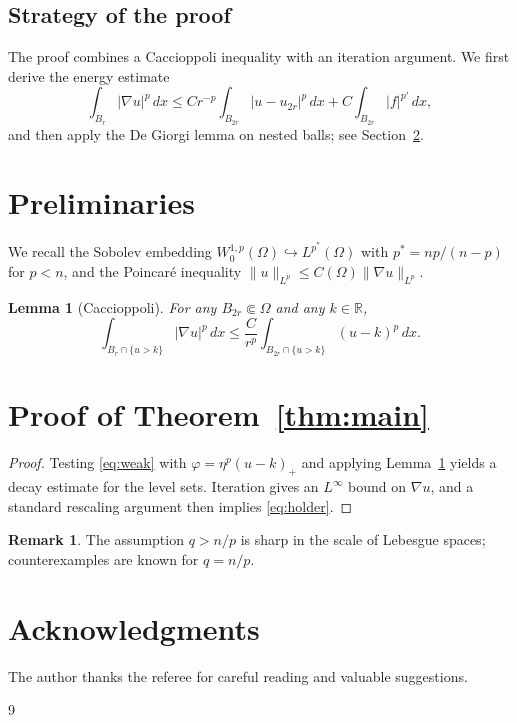 \documentclass[11pt,reqno]{amsart}
\newtheorem{lemma}[theorem]{Lemma}
\theoremstyle{definition}
\newtheorem{remark}[theorem]{Remark}
\newcommand{\R}{\mathbb{R}}
\newcommand{\Om}{\Omega}
\begin{document}
\subsection{Strategy of the proof}
The proof combines a Caccioppoli inequality with an iteration argument.
We first derive the energy estimate
\begin{equation}
  \int_{B_r} |\nabla u|^p\,dx
  \le C r^{-p}\int_{B_{2r}} |u-u_{2r}|^p\,dx + C\int_{B_{2r}}|f|^{p'}\,dx ,
\end{equation}
and then apply the De Giorgi lemma on nested balls; see
Section~\ref{sec:proof}.

\section{Preliminaries}\label{sec:pre}

We recall the Sobolev embedding $W^{1,p}_0(\Om)\hookrightarrow L^{p^*}(\Om)$
with $p^*=np/(n-p)$ for $p<n$, and the Poincaré inequality
$\|u\|_{L^p}\le C(\Om)\|\nabla u\|_{L^p}$.

\begin{lemma}[Caccioppoli]\label{lem:cacc}
For any $B_{2r}\Subset\Om$ and any $k\in\R$,
\begin{equation}
  \int_{B_r\cap\{u>k\}}|\nabla u|^p\,dx
  \le \frac{C}{r^p}\int_{B_{2r}\cap\{u>k\}}(u-k)^p\,dx .
\end{equation}
\end{lemma}

\section{Proof of Theorem~\ref{thm:main}}\label{sec:proof}

\begin{proof}[Proof]
Testing \eqref{eq:weak} with $\varphi=\eta^p(u-k)_+$ and applying
Lemma~\ref{lem:cacc} yields a decay estimate for the level sets.
Iteration gives an $L^\infty$ bound on $\nabla u$, and a standard
rescaling argument then implies \eqref{eq:holder}.
\end{proof}

\begin{remark}
The assumption $q>n/p$ is sharp in the scale of Lebesgue spaces;
counterexamples are known for $q=n/p$.
\end{remark}

\section*{Acknowledgments}
The author thanks the referee for careful reading and valuable suggestions.

\begin{thebibliography}{9}

\end{thebibliography}
\end{document}
